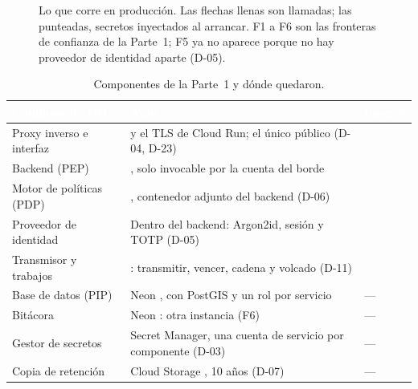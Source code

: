 \documentclass[11pt,a4paper]{article}
\newcommand{\thd}[1]{\cellcolor{tecnavy}\textcolor{white}{\textbf{#1}}}
\theoremstyle{definition}
\theoremstyle{remark}
\begin{document}
\begin{figure}[H]
{}
\caption{Lo que corre en producci\'on. Las flechas llenas son llamadas; las
punteadas, secretos inyectados al arrancar. F1 a F6 son las fronteras de
confianza de la Parte~1; F5 ya no aparece porque no hay proveedor de identidad
aparte (D-05).}
\label{fig:arquitectura}
\end{figure}

\begin{table}[H]
\centering\footnotesize
\caption{Componentes de la Parte~1 y d\'onde quedaron.}
\label{tab:componentes}
\begin{tabularx}{\linewidth}{@{}P{3.4cm}YP{1.9cm}@{}}
\toprule
\thd{Componente (P1)} & \thd{Aqu\'i} & \thd{Imagen}\\
\midrule
Proxy inverso e interfaz &  y el TLS de Cloud Run; el \'unico p\'ublico (D-04, D-23) & \\
Backend (PEP) & , solo invocable por la cuenta del borde & \\
Motor de pol\'iticas (PDP) & , contenedor adjunto del backend (D-06) & \\
Proveedor de identidad & Dentro del backend: Argon2id, sesi\'on y TOTP (D-05) & \\
Transmisor y trabajos & : transmitir, vencer, cadena y volcado (D-11) & \\
Base de datos (PIP) & Neon , con PostGIS y un rol por servicio & ---\\
Bit\'acora & Neon : otra instancia (F6) & ---\\
Gestor de secretos & Secret Manager, una cuenta de servicio por componente (D-03) & ---\\
Copia de retenci\'on & Cloud Storage , 10 a\~nos (D-07) & ---\\
\bottomrule
\end{tabularx}
\end{table}
\end{document}
